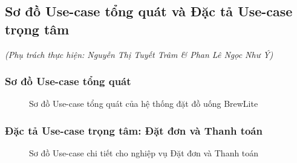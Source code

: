 \subsection{Sơ đồ Use-case tổng quát và Đặc tả Use-case trọng tâm}
\textit{(Phụ trách thực hiện: Nguyễn Thị Tuyết Trâm \& Phan Lê Ngọc Như Ý)}

\subsubsection{Sơ đồ Use-case tổng quát}
\begin{figure}[H]
\centering
{}
\caption{Sơ đồ Use-case tổng quát của hệ thống đặt đồ uống BrewLite}
\end{figure}

\subsubsection{Đặc tả Use-case trọng tâm: Đặt đơn và Thanh toán}
\begin{figure}[H]
\centering
{}
\caption{Sơ đồ Use-case chi tiết cho nghiệp vụ Đặt đơn và Thanh toán}
\end{figure}

